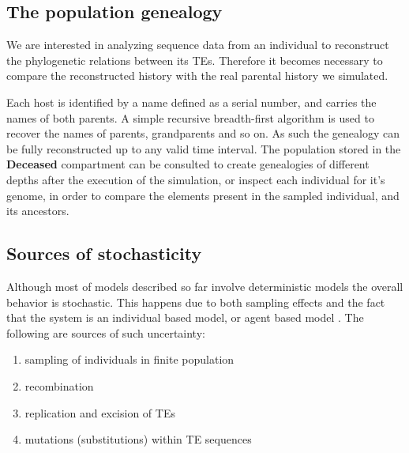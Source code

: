 \documentclass[10pt]{article}
\begin{document}


\subsection{The population genealogy}

We are interested in analyzing sequence data from an individual to
reconstruct the phylogenetic relations between its TEs. Therefore it
becomes necessary to compare the reconstructed history with the real
parental history we simulated.

Each host is identified by a name defined as a serial number, and
carries the names of both parents. A simple recursive breadth-first
algorithm is used to recover the names of parents, grandparents and so
on. As such the genealogy can be fully reconstructed up to any valid
time interval. The population stored in the {\bf Deceased}
compartment can be consulted to create genealogies of different depths
after the execution of the simulation, or inspect each individual for
it's genome, in order to compare the elements present in the sampled
individual, and its ancestors.

\subsection{Sources of stochasticity}
Although most of models described so far involve deterministic models
the overall behavior is stochastic. This happens due to both sampling
effects and the fact that the system is an individual based model, or
agent based model \cite{Bon02}. The following are sources of such
uncertainty:

\begin{enumerate}

\item sampling of individuals in finite population
\label{item:finite}

\item recombination
\label{item:recombination}

\item replication and excision of TEs
\label{item:transposition}

\item mutations (substitutions) within TE sequences
\label{item:mutation}

\end{enumerate}
\end{document}
